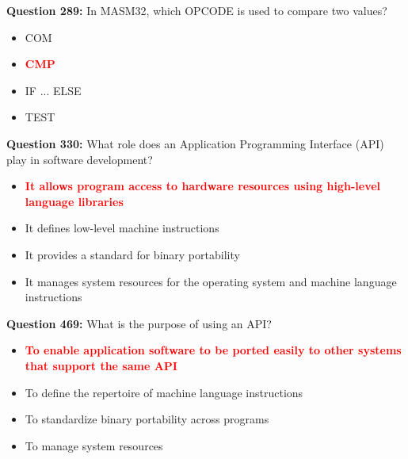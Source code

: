 \documentclass[12pt,a4paper]{article}
\begin{document}
\vspace{0.5cm}

\vspace{0.5cm}

\textbf{Question 289:} In MASM32, which OPCODE is used to compare two values?

\begin{itemize}
    \item[\textbf{A.}] COM
    \item[\textbf{B.}] \textcolor{red}{\textbf{CMP}}
    \item[\textbf{C.}] IF ... ELSE
    \item[\textbf{D.}] TEST
\end{itemize}

\vspace{0.5cm}

\vspace{0.5cm}

\textbf{Question 330:} What role does an Application Programming Interface (API) play in software development?

\begin{itemize}
    \item[\textbf{A.}] \textcolor{red}{\textbf{It allows program access to hardware resources using high-level language libraries}}
    \item[\textbf{B.}] It defines low-level machine instructions
    \item[\textbf{C.}] It provides a standard for binary portability
    \item[\textbf{D.}] It manages system resources for the operating system and machine language instructions
\end{itemize}

\vspace{0.5cm}

\vspace{0.5cm}

\textbf{Question 469:} What is the purpose of using an API?

\begin{itemize}
    \item[\textbf{A.}] \textcolor{red}{\textbf{To enable application software to be ported easily to other systems that support the same API}}
    \item[\textbf{B.}] To define the repertoire of machine language instructions
    \item[\textbf{C.}] To standardize binary portability across programs
    \item[\textbf{D.}] To manage system resources
\end{itemize}
\end{document}
